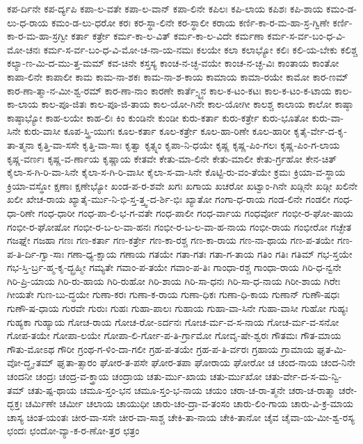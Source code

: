 {ಕಪ-ರ್ದಿನೇ
ಕಪ-ರ್ದ್ಯಪಿ
ಕಪಾ-ಲ-ವತೇ
ಕಪಾ-ಲ-ವಾನ್
ಕಪಾ-ಲಿನೇ
ಕಪಿಲಃ
ಕಪಿ-ಲಾಯ
ಕಪಿಶಃ
ಕಪಿ-ಶಾಯ
ಕಮಂ-ಡ-ಲು-ಧ-ರಾಯ
ಕಮಂ-ಡ-ಲು-ಧರೋ
ಕರಃ
ಕರ-ಸ್ಥಾ-ಲಿನೇ
ಕರ-ಸ್ಥಾಲೀ
ಕರಾಯ
ಕರ್ಣಿ-ಕಾ-ರ-ಮ-ಹಾ-ಸ್ರ-ಗ್ವಿಣೇ
ಕರ್ಣಿ-ಕಾ-ರ-ಮ-ಹಾ-ಸ್ರಗ್ವೀ
ಕರ್ತಾ
ಕರ್ತ್ರೇ
ಕರ್ಮ-ಕಾ-ಲ-ವಿತ್
ಕರ್ಮ-ಕಾ-ಲ-ವಿದೇ
ಕರ್ಮಣಾ
ಕರ್ಮ-ಸ-ರ್ವ-ಬಂ-ಧ-ವಿ-ಮೋ-ಚನಃ
ಕರ್ಮ-ಸ-ರ್ವ-ಬಂ-ಧ-ವಿ-ಮೋ-ಚ-ನಾ-ಯ-ನಮಃ
ಕಲಯೇ
ಕಲಾ
ಕಲಾಭ್ಯೋ
ಕಲಿಃ
ಕಲಿ-ಯ-ಬೇಕು
ಕಲಿಶ್ಚ
ಕಲ್ಯಾ-ಣ-ಮಿ-ದ-ಮು-ತ್ತ-ಮಮ್
ಕವ-ಚಿನೇ
ಕಸ್ತಸ್ಯ
ಕಾಂಚ-ನ-ಚ್ಛ-ವಯೇ
ಕಾಂಚ-ನ-ಚ್ಛ-ವಿಃ
ಕಾಂತಾಯ
ಕಾಂತೋ
ಕಾಪಾ-ಲಿನೇ
ಕಾಪಾಲೀ
ಕಾಮ
ಕಾಮ-ನಾ-ಶಕಃ
ಕಾಮ-ನಾ-ಶ-ಕಾಯ
ಕಾಮಾಯ
ಕಾಮಾ-ರಯೇ
ಕಾಮೋ
ಕಾರ-ಣಮ್
ಕಾರ-ಣಾ-ತ್ಮಾ-ನ-ಮೀ-ಶ್ವ-ರಮ್
ಕಾರ-ಣಾ-ನಾಂ
ಕಾರಣೇ
ಕಾರ್ತೆ-್ಸ್ನ್ಯನ
ಕಾಲ-ಕ-ಟಂ-ಕಟಃ
ಕಾಲ-ಕ-ಟಂ-ಕ-ಟಾಯ
ಕಾಲ-ಕಾ-ಲಾಯ
ಕಾಲ-ಪೂ-ಜಿತಃ
ಕಾಲ-ಪೂ-ಜಿ-ತಾಯ
ಕಾಲ-ಯೋ-ಗಿನೇ
ಕಾಲ-ಯೋಗೀ
ಕಾಲಶ್ಚ
ಕಾಲಾಯ
ಕಾಲೋ
ಕಾಷ್ಠಾ
ಕಾಷ್ಠಾಭ್ಯೋ
ಕಾಹ-ಲಯೇ
ಕಾಹ-ಲಿಃ
ಕಿಂ
ಕುಂಡಿನೇ
ಕುಂಡೀ
ಕುರು-ಕರ್ತಾ
ಕುರು-ಕರ್ತ್ರೇ
ಕುರು-ಭೂತೋ
ಕುರು-ವಾ-ಸಿನೇ
ಕುರು-ವಾಸೀ
ಕೂಪ-ಸ್ತ್ರಿ-ಯುಗಃ
ಕೂಲ-ಕರ್ತಾ
ಕೂಲ-ಕರ್ತ್ರೇ
ಕೂಲ-ಹಾ-ರಿಣೇ
ಕೂಲ-ಹಾರೀ
ಕೃತೈ-ರ್ವೇ-ದ-ಕೃ-ತಾ-ತ್ಮನಾ
ಕೃತ್ತಿ-ವಾ-ಸಸೇ
ಕೃತ್ತಿ-ವಾ-ಸಾಃ
ಕೃತ್ವಾ
ಕೃತ್ಸ್ನಂ
ಕೃಪಾ-ನಿ-ಧಯೇ
ಕೃಷ್ಣ
ಕೃಷ್ಣ-ಪಿಂ-ಗಲಃ
ಕೃಷ್ಣ-ಪಿಂ-ಗ-ಲಾಯ
ಕೃಷ್ಣ-ವರ್ಣಃ
ಕೃಷ್ಣ-ವ-ರ್ಣಾಯ
ಕೃಷ್ಣಾಯ
ಕೇತವೇ
ಕೇತು-ಮಾ-ಲಿನೇ
ಕೇತು-ಮಾಲೀ
ಕೇತು-ರ್ಗ್ರಹೋ
ಕೇನ-ಚಿತ್
ಕೈಲಾ-ಸ-ಗಿ-ರಿ-ವಾ-ಸಿನೇ
ಕೈಲಾ-ಸ-ಗಿ-ರಿ-ವಾಸೀ
ಕೈಲಾ-ಸ-ವಾ-ಸಿನೇ
ಕೊಟ್ಟಿ-ರು-ವಂ-ತೆಯೇ
ಕ್ರಮಃ
ಕ್ರಿಯಾ-ವ-ಸ್ಥಾಯ
ಕ್ರಿಯಾ-ವಸ್ಥೋ
ಕ್ಷಣಾಃ
ಕ್ಷಣೇಭ್ಯೋ
ಖಂಡ-ಪ-ರ-ಶವೇ
ಖಗಃ
ಖಗಾಯ
ಖಚರೋ
ಖಟ್ವಾಂ-ಗಿನೇ
ಖಡ್ಗಿನೇ
ಖಡ್ಗೀ
ಖಲಿನೇ
ಖಲೀ
ಖೇಚ-ರಾಯ
ಖ್ಯಾತೈ-ರ್ಮು-ನಿ-ಭಿ-ಸ್ತ-ತ್ತ್ವ-ದ-ರ್ಶಿ-ಭಿಃ
ಖ್ಯಾತೋ
ಗಂಗಾ-ಧ-ರಾಯ
ಗಂಡ-ಲಿನೇ
ಗಂಡಲೀ
ಗಂಧ-ಧಾ-ರಿಣೇ
ಗಂಧ-ಧಾರೀ
ಗಂಧ-ಪಾ-ಲಿ-ಭ-ಗ-ವತೇ
ಗಂಧ-ಪಾಲೀ
ಗಂಧ-ರ್ವಾಯ
ಗಂಧರ್ವೋ
ಗಂಭೀ-ರ-ಘೋ-ಷಾಯ
ಗಂಭೀ-ರ-ಘೋಷೋ
ಗಂಭೀ-ರ-ಬ-ಲ-ವಾ-ಹನಃ
ಗಂಭೀ-ರ-ಬ-ಲ-ವಾ-ಹ-ನಾಯ
ಗಂಭೀ-ರಾಯ
ಗಂಭೀರೋ
ಗಚ್ಛೇತ
ಗಜಘ್ನೇ
ಗಜಹಾ
ಗಣಃ
ಗಣ-ಕರ್ತಾ
ಗಣ-ಕರ್ತ್ರೇ
ಗಣ-ಕಾ-ರಶ್ಚ
ಗಣ-ಕಾ-ರಾಯ
ಗಣ-ನಾ-ಥಾಯ
ಗಣ-ಪ-ತಯೇ
ಗಣ-ಪ-ತಿ-ರ್ದಿ-ಗ್ವಾ-ಸಾಃ
ಗಣಾ-ಧ್ಯ-ಕ್ಷಾಯ
ಗಣಾಯ
ಗತಯೇ
ಗತಾ-ಗತಃ
ಗತಾ-ಗ-ತಾಯ
ಗತಿಂ
ಗತಿಃ
ಗತಿಮ್
ಗಭ-ಸ್ತಯೇ
ಗಭ-ಸ್ತಿ-ರ್ಬ್ರ-ಹ್ಮ-ಕೃ-ದ್ಬ್ರಹ್ಮೀ
ಗಮ್ಯತೇ
ಗವಾಂ-ಪ-ತಯೇ
ಗವಾಂ-ಪ-ತಿಃ
ಗಾಂಧಾ-ರಶ್ಚ
ಗಾಂಧಾ-ರಾಯ
ಗಿರಿ-ಧ-ನ್ವನೇ
ಗಿರಿ-ಪ್ರಿ-ಯಾಯ
ಗಿರಿ-ರು-ಹಾಯ
ಗಿರಿ-ರುಹೋ
ಗಿರಿ-ಶಾಯ
ಗಿರಿ-ಸಾ-ಧನಃ
ಗಿರಿ-ಸಾ-ಧ-ನಾಯ
ಗಿರೀ-ಶಾಯ
ಗಿರೇಃ
ಗೀಯತೇ
ಗುಣ-ಬು-ದ್ಧಯೇ
ಗುಣಾ-ಕರಃ
ಗುಣಾ-ಕ-ರಾಯ
ಗುಣಾ-ಧಿಕಃ
ಗುಣಾ-ಧಿ-ಕಾಯ
ಗುಣಾನ್
ಗುಣೌ-ಷಧಃ
ಗುಣೌ-ಷ-ಧಾಯ
ಗುರವೇ
ಗುರುಃ
ಗುಹಃ
ಗುಹಾ-ಪಾಲಃ
ಗುಹಾಯ
ಗುಹಾ-ವಾ-ಸಿನೇ
ಗುಹಾ-ವಾಸೀ
ಗುಹೋ
ಗುಹ್ಯಃ
ಗುಹ್ಯಕಾ
ಗುಹ್ಯಾಯ
ಗೋಚ-ರಾಯ
ಗೋಚ-ರೋ-ಽರ್ದನಃ
ಗೋಚ-ರ್ಮ-ವ-ಸ-ನಾಯ
ಗೋಚ-ರ್ಮ-ವ-ಸನೋ
ಗೋಪ-ತಯೇ
ಗೋಪಾ-ಲಯೇ
ಗೋಪಾ-ಲಿ-ರ್ಗೋ-ಪ-ತಿ-ರ್ಗ್ರಾಮೋ
ಗೋವೃ-ಷೇ-ಶ್ವರಃ
ಗೌತಮಃ
ಗೌತ-ಮಾಯ
ಗೌತು-ಮೋಽಥ
ಗೌರೀ
ಗ್ರಂಥ-ಗ-ಳಿಂ-ದಾ-ಗಲೀ
ಗ್ರಹ-ಪ-ತಯೇ
ಗ್ರಹ-ಪ-ತಿ-ರ್ವರಃ
ಗ್ರಹಾಯ
ಗ್ರಾಮಾಯ
ಘೃತ-ಮಿ-ವೋ-ದ್ಧೃ-ತಮ್
ಘೃತಾ-ತ್ಸಾರಂ
ಘೋರ-ತ-ಪಸೇ
ಘೋರ-ತಪಾ
ಘೋರಾಯ
ಘೋರೋ
ಚ
ಚಂದ-ನಾಯ
ಚಂದ-ನಿನೇ
ಚಂದನೀ
ಚಂದ್ರಃ
ಚಂದ್ರ-ವ-ಕ್ತ್ರಾಯ
ಚಂದ್ರಾಯ
ಚತು-ರ್ಮು-ಖಾಯ
ಚತು-ರ್ಮುಖೋ
ಚತು-ರ್ವೇ-ದ-ಸ-ಮ-ನ್ವಿ-ತಮ್
ಚತು-ಷ್ಪ-ಥಾಯ
ಚಮೂ-ಸ್ತಂ-ಭನ
ಚಮೂ-ಸ್ತಂ-ಭ-ನಾಯ
ಚಯಂ
ಚರಾ-ಚ-ರಾ-ತ್ಮನೇ
ಚರಾ-ಚ-ರಾತ್ಮಾ
ಚರೇ-ದ್ಭಕ್ತಃ
ಚರ್ಮಿಣೇ
ಚರ್ಮೀ
ಚಲಾಯ
ಚಾಯುಧೀ
ಚಾರು-ಚಂ-ದ್ರಾ-ವ-ತಂಸಂ
ಚಾರು-ಲಿಂ-ಗಾಯ
ಚಾರು-ವಿ-ಕ್ರ-ಮಾಯ
ಚಾಸ್ಯ
ಚಿಂತ-ಯಂತಃ
ಚೀರ-ವಾ-ಸಸೇ
ಚೀರ-ವಾ-ಸಾಶ್ಚ
ಚೇಕಿ-ತಾ-ನಾಯ
ಚೇಕಿ-ತಾನೋ
ಚೈವ
ಚೈವಾ-ಯ-ಮೀ-ಶ್ವ-ರಸ್ಯ
ಛಂದಃ
ಛಂದೋ-ವ್ಯಾ-ಕ-ರ-ಣೋ-ತ್ತರ
ಛತ್ರಂ
}
